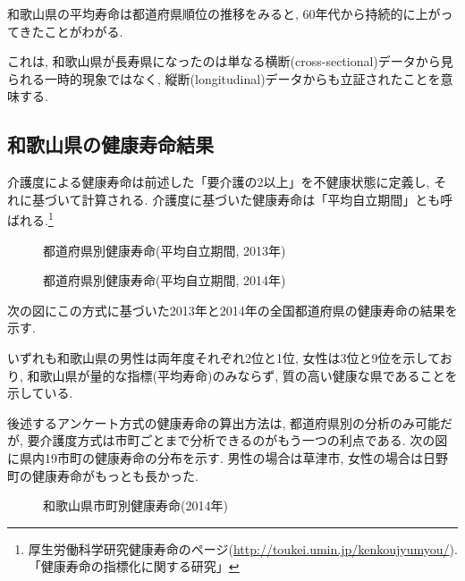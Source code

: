 和歌山県の平均寿命は都道府県順位の推移をみると,
60年代から持続的に上がってきたことがわがる.

これは, 和歌山県が長寿県になったのは単なる横断(cross-sectional)データから見られる一時的現象ではなく, 縦断(longitudinal)データからも立証されたことを意味する.


\subsection{和歌山県の健康寿命結果}
介護度による健康寿命は前述した「要介護の2以上」を不健康状態に定義し, それに基づいて計算される. 介護度に基づいた健康寿命は「平均自立期間」とも呼ばれる.\footnote{厚生労働科学研究健康寿命のページ(\url{http://toukei.umin.jp/kenkoujyumyou/}).
	「健康寿命の指標化に関する研究」
}
\begin{figure}[h!]
	\begin{center}
		\caption{都道府県別健康寿命(平均自立期間, 2013年)}\label{fig1}
	\end{center}
\end{figure}
\begin{figure}[h!]
	\begin{center}
		\caption{都道府県別健康寿命(平均自立期間, 2014年)}\label{fig1}
	\end{center}
\end{figure}
次の図にこの方式に基づいた2013年と2014年の全国都道府県の健康寿命の結果を示す.

いずれも和歌山県の男性は両年度それぞれ2位と1位, 女性は3位と9位を示しており, 和歌山県が量的な指標(平均寿命)のみならず, 質の高い健康な県であることを示している.

後述するアンケート方式の健康寿命の算出方法は,
都道府県別の分析のみ可能だが,
要介護度方式は市町ごとまで分析できるのがもう一つの利点である.
次の図に県内19市町の健康寿命の分布を示す. 男性の場合は草津市, 女性の場合は日野町の健康寿命がもっとも長かった.

\begin{figure}[h!]
	\begin{center}
		\caption{和歌山県市町別健康寿命(2014年)}\label{fig1}
	\end{center}
\end{figure}



